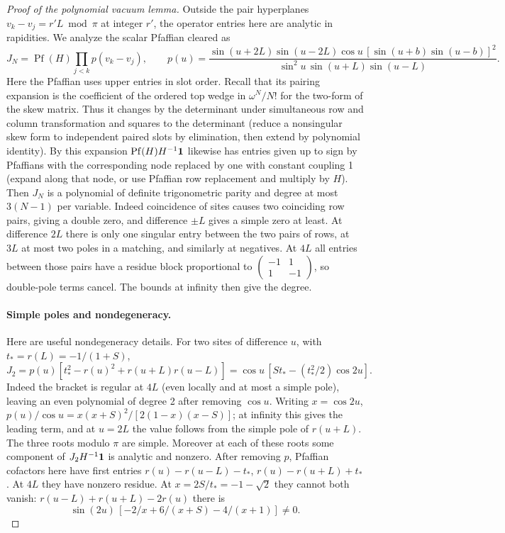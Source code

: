 \begin{proof}[Proof of the polynomial vacuum lemma]
Outside the pair hyperplanes \(v_k-v_j=r'L\bmod\pi\) at integer \(r'\), the operator entries here are analytic in rapidities. We analyze the scalar Pfaffian cleared as
\[
 J_N=\operatorname{Pf}(H)\prod_{j<k}p(v_k-v_j),\qquad
 p(u)=\frac{\sin(u+2L)\sin(u-2L)\cos u\, [\sin(u+b)\sin(u-b)]^2}
 {\sin^2u\,\sin(u+L)\sin(u-L)} .
\]
Here the Pfaffian uses upper entries in slot order. Recall that its pairing expansion is the coefficient of the ordered top wedge in \(\omega^N/N!\) for the two-form of the skew matrix. Thus it changes by the determinant under simultaneous row and column transformation and squares to the determinant (reduce a nonsingular skew form to independent paired slots by elimination, then extend by polynomial identity). By this expansion \(\operatorname{Pf}(H) H^{-1}{\bf1}\) likewise has entries given up to sign by Pfaffians with the corresponding node replaced by one with constant coupling 1 (expand along that node, or use Pfaffian row replacement and multiply by \(H\)). Then \(J_N\) is a polynomial of definite trigonometric parity and degree at most \(3(N-1)\) per variable. Indeed coincidence of sites causes two coinciding row pairs, giving a double zero, and difference \(\pm L\) gives a simple zero at least. At difference \(2L\) there is only one singular entry between the two pairs of rows, at \(3L\) at most two poles in a matching, and similarly at negatives. At \(4L\) all entries between those pairs have a residue block proportional to \(\left(\begin{smallmatrix}-1&1\\1&-1\end{smallmatrix}\right)\), so double-pole terms cancel. The bounds at infinity then give the degree.

\paragraph{Simple poles and nondegeneracy.}
Here are useful nondegeneracy details. For two sites of difference \(u\), with \(t_*=r(L)=-1/(1+S)\),
\[
 J_2=p(u)[t_*^2-r(u)^2+r(u+L)r(u-L)]
     =\cos u\, [S t_*-(t_*^2/2)\cos 2u].
\]
Indeed the bracket is regular at \(4L\) (even locally and at most a simple pole), leaving an even polynomial of degree 2 after removing \(\cos u\). Writing \(x=\cos 2u\), \(p(u)/\cos u=x(x+S)^2/[2(1-x)(x-S)]\); at infinity this gives the leading term, and at \(u=2L\) the value follows from the simple pole of \(r(u+L)\). The three roots modulo \(\pi\) are simple. Moreover at each of these roots some component of \(J_2 H^{-1}{\bf1}\) is analytic and nonzero. After removing \(p\), Pfaffian cofactors here have first entries \(r(u)-r(u-L)-t_*\), \(r(u)-r(u+L)+t_*\). At \(4L\) they have nonzero residue. At \(x=2S/t_*=-1-\sqrt2\) they cannot both vanish: \(r(u-L)+r(u+L)-2r(u)\) there is
\[
 \sin(2u)\,[-2/x+6/(x+S)-4/(x+1)]\ne0.
\]


\end{proof}
